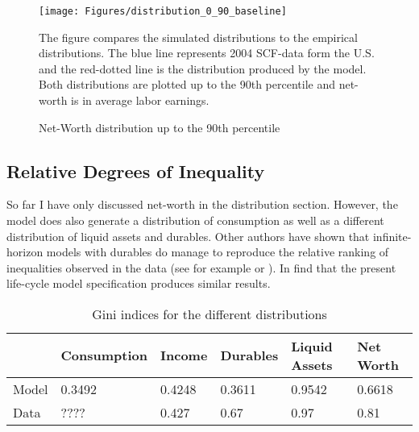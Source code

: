 \documentclass[a4paper,12pt,legno]{article}
\begin{document}
\begin{figure}[!htbp]
\caption{Net-Worth distribution up to the 90th percentile} 
\label{wealth_distr_base}	%
\centering
\texttt{[image: Figures/distribution\_0\_90\_baseline]}  %

\begin{minipage}{0.8\linewidth}
\footnotesize{The figure compares the simulated distributions to the empirical distributions. The blue line represents 2004 SCF-data form the U.S. and the red-dotted line is the distribution produced by the model. Both distributions are plotted up to the 90th percentile and net-worth is in average labor earnings.}
\end{minipage}

\end{figure}


\subsection{Relative Degrees of Inequality}
So far I have only discussed net-worth in the distribution section. However, the model does also generate a distribution of consumption as well as a different distribution of liquid assets and durables. Other authors have shown that infinite-horizon models with durables do manage to reproduce the relative ranking of inequalities observed in the data (see for example \cite{hintermaier2010} or \cite{diaz2010}). In find that the present life-cycle model specification produces similar results.


\begin{table}[!htbp]
\centering
\caption{Gini indices for the different distributions}
\label{Gini_Ranking}
\begin{tabular}{@{}llllll@{}}
\toprule
      & Consumption & Income & Durables & Liquid Assets & Net Worth \\ \midrule
Model & 0.3492      & 0.4248 & 0.3611   & 0.9542        & 0.6618    \\ \midrule
Data  & ????        & 0.427  & 0.67     & 0.97          & 0.81      \\ \bottomrule
\end{tabular}
\end{table}
\end{document}
